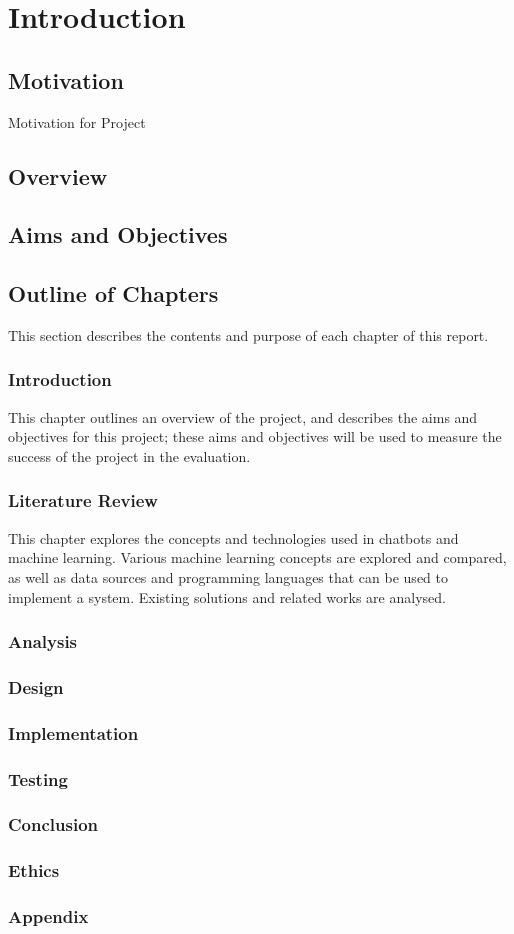 \chapter{Introduction}
\section{Motivation}
Motivation for Project

\section{Overview}

\section{Aims and Objectives}

\newpage
\section{Outline of Chapters}
This section describes the contents and purpose of each chapter of this report.

\subsection*{Introduction}
This chapter outlines an overview of the project, and describes the aims and objectives for this project; these aims and objectives will be used to measure the success of the project in the evaluation.

\subsection*{Literature Review}
This chapter explores the concepts and technologies used in chatbots and machine learning. Various machine learning concepts are explored and compared, as well as data sources and programming languages that can be used to implement a system. Existing solutions and related works are analysed.

\subsection*{Analysis}

\subsection*{Design}

\subsection*{Implementation}

\subsection*{Testing}

\subsection*{Conclusion}

\subsection*{Ethics}

\subsection*{Appendix}
